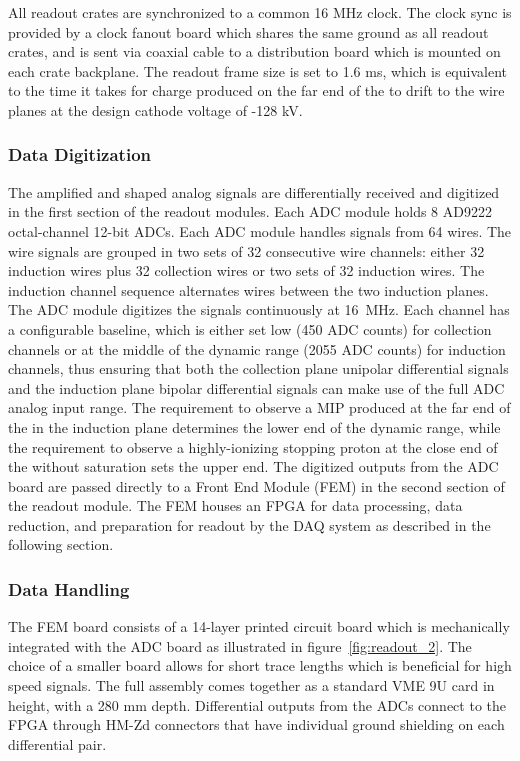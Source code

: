 All readout crates are synchronized to a common 16 MHz clock. The clock sync is provided by a clock fanout board which shares the same ground as all readout crates, and is sent via coaxial cable to a distribution board which is mounted on each crate backplane. The readout frame size is set to 1.6 ms, which is equivalent to the time it takes for charge produced on the far end of the \lartpc to drift to the wire planes at the design cathode voltage of -128 kV.

\subsubsection{\label{sssec:tpcdigitization} Data Digitization}

The amplified and shaped analog \lartpc signals are differentially received and digitized in the first section of the readout modules. Each ADC module holds 8 AD9222 octal-channel 12-bit ADCs. Each ADC module handles signals from 64 wires. The wire signals are grouped in two sets of 32 consecutive wire channels: either 32 induction wires plus 32 collection wires or two sets of 32 induction wires. The induction channel sequence alternates wires between the two induction planes. The ADC module digitizes the signals continuously at 16~MHz. Each channel has a configurable baseline, which is either set low (450 ADC counts) for collection channels or at the middle of the dynamic range (2055 ADC counts) for induction channels, thus ensuring that both the collection plane unipolar differential signals and the induction plane bipolar differential signals can make use of the full ADC analog input range. The requirement to observe a MIP produced at the far end of the \lartpc in the induction plane determines the lower end of the dynamic range, while the requirement to observe a highly-ionizing stopping proton at the close end of the \lartpc without saturation sets the upper end. The digitized outputs from the ADC board are passed directly to a Front End Module (FEM) in the second section of the \lartpc readout module. The FEM houses an FPGA for data processing, data reduction, and preparation for readout by the DAQ system as described in the following section. 

\subsubsection{\label{sssec:tpcFEM} Data Handling}

The FEM board consists of a 14-layer printed circuit board which is mechanically integrated with the ADC board as illustrated in figure~\ref{fig:readout_2}. The choice of a smaller board allows for short trace lengths which is beneficial for high speed signals. The full assembly comes together as a standard VME 9U card in height, with a 280 mm depth. Differential outputs from the ADCs connect to the FPGA through HM-Zd connectors that have individual ground shielding on each differential pair. 

